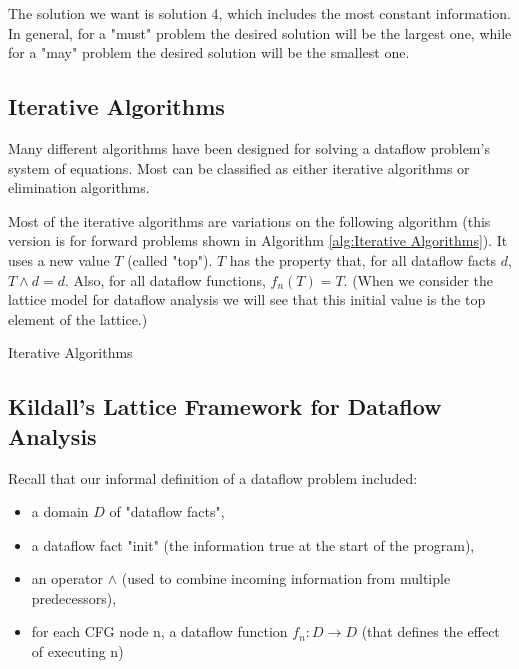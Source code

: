The solution we want is solution 4, which includes the most constant
information. In general, for a "must" problem the desired solution will be
the largest one,
while for a "may" problem the desired solution will be the smallest one.


\subsection{Iterative Algorithms}

Many different algorithms have been designed for solving a dataflow
problem's system of equations. Most can be classified as either
iterative algorithms or elimination algorithms.


Most of the iterative algorithms are variations on the following
algorithm (this version is for forward problems shown in Algorithm \ref{alg:Iterative Algorithms}). It uses a new
value $T$ (called "top"). $T$ has the property that, for all dataflow
facts $d$, $T \wedge d = d$. Also, for all dataflow functions, $f_n(T) = T$.
(When we consider the lattice model for dataflow analysis we
will see that this initial value is the top element of the lattice.)






\begin{algorithm}
	\caption{Iterative Algorithms}\label{alg:Iterative Algorithms}
	\begin{algorithmic}
		\EndIf
		\EndWhile
	\end{algorithmic}
\end{algorithm}


\subsection{Kildall's Lattice Framework for Dataflow Analysis}


Recall that our informal definition of a dataflow problem included:
\begin{itemize}
	\item a domain $D$ of "dataflow facts",
	\item a dataflow fact "init" (the information true at the start
	      of the program),
	\item an operator $\wedge$ (used to combine incoming information from multiple predecessors),
	\item for each CFG node n, a dataflow function
	      $f_n : D \rightarrow D$ (that defines the effect of executing n)

\end{itemize}

